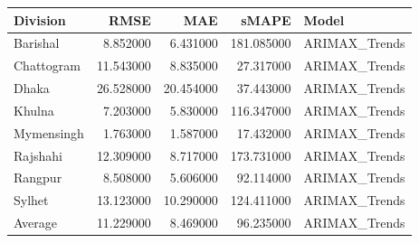 \begin{tabular}{lrrrl}
\toprule
Division & RMSE & MAE & sMAPE & Model \\
\midrule
Barishal & 8.852000 & 6.431000 & 181.085000 & ARIMAX_Trends \\
Chattogram & 11.543000 & 8.835000 & 27.317000 & ARIMAX_Trends \\
Dhaka & 26.528000 & 20.454000 & 37.443000 & ARIMAX_Trends \\
Khulna & 7.203000 & 5.830000 & 116.347000 & ARIMAX_Trends \\
Mymensingh & 1.763000 & 1.587000 & 17.432000 & ARIMAX_Trends \\
Rajshahi & 12.309000 & 8.717000 & 173.731000 & ARIMAX_Trends \\
Rangpur & 8.508000 & 5.606000 & 92.114000 & ARIMAX_Trends \\
Sylhet & 13.123000 & 10.290000 & 124.411000 & ARIMAX_Trends \\
Average & 11.229000 & 8.469000 & 96.235000 & ARIMAX_Trends \\
\bottomrule
\end{tabular}
